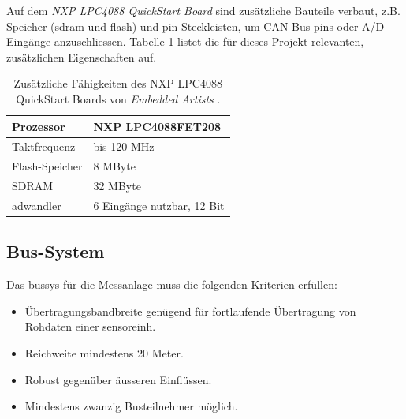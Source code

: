 Auf dem \emph{NXP LPC4088 QuickStart Board} sind zusätzliche Bauteile verbaut, z.B. Speicher (\gls{sdram} und \gls{flash}) und \gls{pin}-Steckleisten, um CAN-Bus-\glspl{pin} oder A/D-Eingänge anzuschliessen. Tabelle \ref{table.nxplpc4088qsb} listet die für dieses Projekt relevanten, zusätzlichen Eigenschaften auf.

\begin{table}
\begin{center}
\begin{tabular}{|l|l|}
\hline
\begin{minipage}{38mm}Prozessor\end{minipage} & \begin{minipage}{44mm}NXP LPC4088FET208\end{minipage}\\
\hline
Taktfrequenz & bis 120 MHz \\
\hline
Flash-Speicher & 8 MByte \\
\hline
SDRAM & 32 MByte \\
\hline
\gls{adwandler} & 6 Eingänge nutzbar, 12 Bit \\
\hline
\end{tabular}
\caption{Zusätzliche Fähigkeiten des NXP LPC4088 QuickStart Boards von \emph{Embedded Artists}  \cite{nxplpc4088qsb}.}
\label{table.nxplpc4088qsb}
\end{center}
\end{table}

\subsection{Bus-System}
Das \gls{bussys} für die Messanlage muss die folgenden Kriterien erfüllen:
\begin{itemize}
\item Übertragungsbandbreite genügend für fortlaufende Übertragung von Rohdaten einer \gls{sensoreinh}.
\item Reichweite mindestens 20 Meter.
\item Robust gegenüber äusseren Einflüssen.
\item Mindestens zwanzig Busteilnehmer möglich.
\end{itemize}

